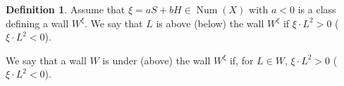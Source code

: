 \documentclass[11pt,twoside]{amsart}
\theoremstyle{definition}
\newtheorem{definition}[theorem]{Definition}
\newcommand{\Num}{\operatorname{Num}}
\begin{document}










\begin{definition}
Assume that $\xi= a S+bH\in \Num(X)$ with $a<0$ is a class defining a wall $W^\xi$.
We say that $L$ is above (below) the wall $W^\xi$ if $\xi\cdot L^{2}>0$ ($\xi\cdot L^{2}<0$).

We say that a wall $W$ is under (above) the wall $W^{\xi}$ if, for $L\in W$, $\xi\cdot L^{2}>0$ ($\xi\cdot L^{2}<0$).
\end{definition}
    
\end{document}
